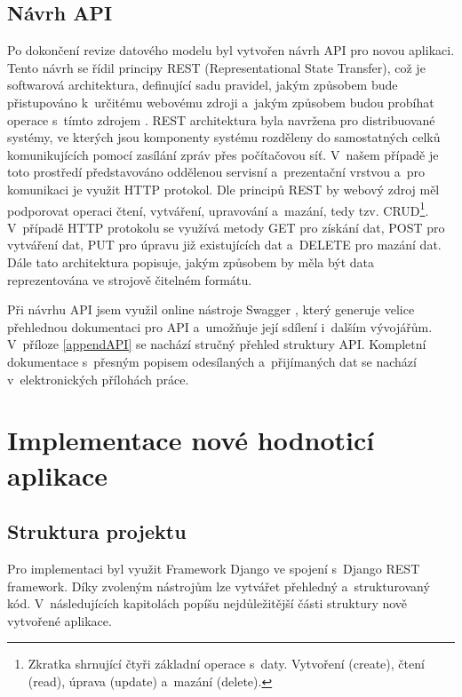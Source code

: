 \documentclass[
  digital,
  twoside,
  table, 
  nolof, 
  nolot
]{fithesis3}
\begin{document}
\newpage

\section{Návrh API}

Po dokončení revize datového modelu byl vytvořen návrh API pro novou aplikaci. Tento návrh se řídil principy REST (Representational State Transfer), což je softwarová architektura, definující sadu pravidel, jakým způsobem bude přistupováno k~určitému webovému zdroji a~jakým způsobem budou probíhat operace s~tímto zdrojem \cite{RoyThomasFielding2000ArchitecturalArchitectures}.
REST architektura byla navržena pro distribuované systémy, ve kterých jsou komponenty systému rozděleny do samostatných celků komunikujících pomocí zasílání zpráv přes počítačovou síť. V~našem případě je toto prostředí představováno oddělenou servisní a~prezentační vrstvou a~pro komunikaci je využit HTTP protokol.  Dle principů REST by webový zdroj měl podporovat operaci čtení, vytváření, upravování a~mazání, tedy tzv. CRUD\footnote{Zkratka shrnující čtyři základní operace s~daty. Vytvoření (create), čtení (read), úprava (update) a~mazání (delete).}. V~případě HTTP protokolu se využívá metody GET pro získání dat, POST pro vytváření dat, PUT pro úpravu již existujících dat a~DELETE pro mazání dat. Dále tato architektura popisuje, jakým způsobem by měla být data reprezentována ve strojově čitelném formátu. \cite{RoyThomasFielding2000ArchitecturalArchitectures}

Při návrhu API jsem využil online nástroje Swagger \cite{swagger}, který generuje velice přehlednou dokumentaci pro API a~umožňuje její sdílení i~dalším vývojářům. V~příloze \ref{appendAPI} se nachází stručný přehled struktury API. Kompletní dokumentace s~přesným popisem odesílaných a~přijímaných dat se nachází v~elektronických přílohách práce.

\chapter{Implementace nové hodnoticí aplikace}
\label{implementationNewApp}

\section{Struktura projektu}
Pro implementaci byl využit Framework Django ve spojení s~Django REST framework. Díky zvoleným nástrojům lze vytvářet přehledný a~strukturovaný kód. V~následujících kapitolách popíšu nejdůležitější části struktury nově vytvořené aplikace.
\end{document}
